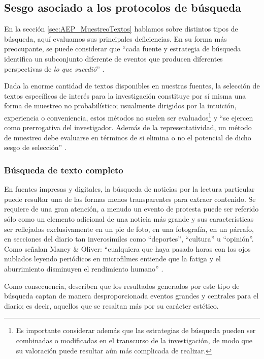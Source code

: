 \documentclass[letterpaper, 11pt]{book}
\theoremstyle{definition}
\theoremstyle{remark}
\begin{document}
\subsection{Sesgo asociado a los protocolos de búsqueda}
\label{sec:Sesgo_protocolo_busqueda}

En la sección \ref{sec:AEP_MuestreoTextos} hablamos sobre distintos tipos de búsqueda, aquí evaluamos sus principales deficiencias. En su forma más preocupante, se puede considerar que ``cada fuente y estrategia de búsqueda identifica un subconjunto diferente de eventos que producen diferentes perspectivas de \emph{lo que sucedió}'' \citep[132]{2001_Maney_Oliver__FindingEvents}.

Dada la enorme cantidad de textos disponibles en nuestras fuentes, la selección de textos específicos de interés para la investigación constituye por sí misma una forma de muestreo no probabilístico; usualmente dirigidos por la intuición, experiencia o conveniencia, estos métodos no suelen ser evaluados\footnote{Es importante considerar además que las estrategias de búsqueda pueden ser combinadas o modificadas en el transcurso de la investigación, de modo que su valoración puede resultar aún más complicada de realizar.} y ``se ejercen como prerrogativa del investigador. Además de la representatividad, un método de muestreo debe evaluarse en términos de si elimina o no el potencial de dicho sesgo de selección'' \citep[5]{2015_Lacy_BestContentAnalysis}.


\subsubsection{Búsqueda de texto completo}
\label{sec:sesgoMuestreo_full}

En fuentes impresas y digitales, la búsqueda de noticias por la lectura particular puede resultar una de las formas menos transparentes para extraer contenido. 
Se requiere de una gran atención, a menudo un evento de protesta puede ser referido sólo como un elemento adicional de una noticia más grande y sus características ser reflejadas exclusivamente en un pie de foto, en una fotografía, en un párrafo, en secciones del diario tan inverosímiles como ``deportes'', ``cultura'' u ``opinión''. 
Como señalan Maney \& Oliver: ``cualquiera que haya pasado horas con los ojos nublados leyendo periódicos en microfilmes entiende que la fatiga y el aburrimiento disminuyen el rendimiento humano'' \citep[136]{2001_Maney_Oliver__FindingEvents}.

Como consecuencia, \citet{2001_Maney_Oliver__FindingEvents} describen que los resultados generados por este tipo de búsqueda captan de manera desproporcionada eventos grandes y centrales para el diario; es decir, aquellos que se resaltan más por su carácter estético.
\end{document}

